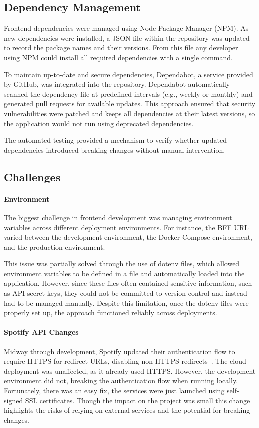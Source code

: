 \subsection{Dependency Management}
Frontend dependencies were managed using Node Package Manager (NPM). As new dependencies were installed, a JSON file within the repository was updated to record the package names and their versions. From this file any developer using NPM could install all required dependencies with a single command.

To maintain up-to-date and secure dependencies, Dependabot, a service provided by GitHub, was integrated into the repository. Dependabot automatically scanned the dependency file at predefined intervals (e.g., weekly or monthly) and generated pull requests for available updates. This approach ensured that security vulnerabilities were patched and keeps all dependencies at their latest versions, so the application would not run using deprecated dependencies.

The automated testing provided a mechanism to verify whether updated dependencies introduced breaking changes without manual intervention.

\subsection{Challenges}
\paragraph{Environment}
The biggest challenge in frontend development was managing environment variables across different deployment environments. For instance, the BFF URL varied between the development environment, the Docker Compose environment, and the production environment.

This issue was partially solved through the use of dotenv files, which allowed environment variables to be defined in a file and automatically loaded into the application. However, since these files often contained sensitive information, such as API secret keys, they could not be committed to version control and instead had to be managed manually. Despite this limitation, once the dotenv files were properly set up, the approach functioned reliably across deployments.

\paragraph{Spotify API Changes}
Midway through development, Spotify updated their authentication flow to require HTTPS for redirect URLs, disabling non-HTTPS redirects~\cite{spotifyredirects}. The cloud deployment was unaffected, as it already used HTTPS. However, the development environment did not, breaking the authentication flow when running locally. Fortunately, there was an easy fix, the services were just launched using self-signed SSL certificates. Though the impact on the project was small this change highlights the risks of relying on external services and the potential for breaking changes.

